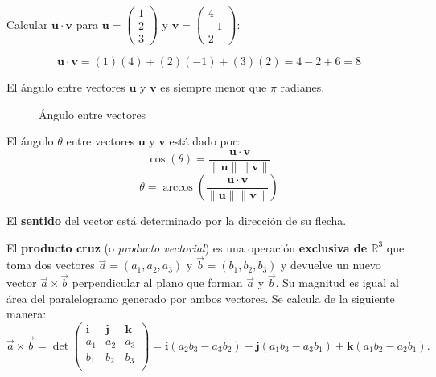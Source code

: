 \begin{example}
Calcular $\mathbf{u} \cdot \mathbf{v}$ para $\mathbf{u} = \begin{pmatrix} 1 \\ 2 \\ 3 \end{pmatrix}$ y $\mathbf{v} = \begin{pmatrix} 4 \\ -1 \\ 2 \end{pmatrix}$:

\begin{myproof}
$$\mathbf{u} \cdot \mathbf{v} = (1)(4) + (2)(-1) + (3)(2) = 4 - 2 + 6 = 8$$
\end{myproof}
\end{example}


\begin{rem}
El ángulo entre vectores $\mathbf{u}$ y $\mathbf{v}$ es siempre menor que $\pi$ radianes.

\begin{figure}[H]
\centering
{}
\caption{Ángulo entre vectores}
\end{figure}
\end{rem}


\begin{definition}
El ángulo $\theta$ entre vectores $\mathbf{u}$ y $\mathbf{v}$ está dado por:
$$\cos(\theta) = \frac{\mathbf{u} \cdot \mathbf{v}}{\|\mathbf{u}\| \|\mathbf{v}\|}$$
$$\theta = \arccos\left(\frac{\mathbf{u} \cdot \mathbf{v}}{\|\mathbf{u}\| \|\mathbf{v}\|}\right)$$
\end{definition}

El \textbf{sentido} del vector está determinado por la dirección de su flecha.

\begin{definition} \label{defprodcruz}
El \textbf{producto cruz} (o \textit{producto vectorial}) es una operación \textbf{exclusiva de $\mathbb{R}^3$} que toma dos vectores $\vec{a} = (a_1, a_2, a_3)$ y $\vec{b} = (b_1, b_2, b_3)$ y devuelve un nuevo vector $\vec{a} \times \vec{b}$ perpendicular al plano que forman $\vec{a}$ y $\vec{b}$. Su magnitud es igual al área del paralelogramo generado por ambos vectores. Se calcula de la siguiente manera: 
\[
\vec{a} \times \vec{b} = \det\begin{pmatrix}
\mathbf{i} & \mathbf{j} & \mathbf{k} \\
a_1 & a_2 & a_3 \\
b_1 & b_2 & b_3 \\
\end{pmatrix} = \mathbf{i}(a_2b_3 - a_3b_2) - \mathbf{j}(a_1b_3 - a_3b_1) + \mathbf{k}(a_1b_2 - a_2b_1).
\]
\end{definition}

